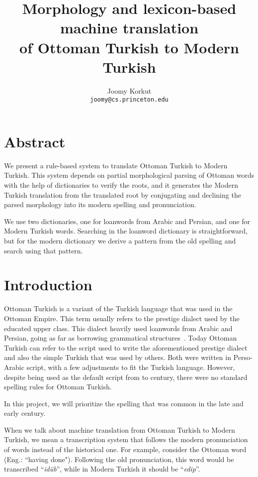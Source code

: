 \documentclass[10pt,twocolumn]{article}
\title{Morphology and lexicon-based machine translation\\of Ottoman Turkish to Modern Turkish}
\author{
  Joomy Korkut\\
  \texttt{joomy@cs.princeton.edu}
}
\date{}
\theoremstyle{nonumberplain}
\newcommand{\otto}[1]{\RLE{\ottoman{}\Large{}#1}}
\newcommand{\word}[1]{``\emph{#1}''}
\begin{document}
\setlength{\abovedisplayskip}{-17pt}
\setlength{\belowdisplayskip}{0pt}
\setlength{\abovedisplayshortskip}{0pt}
\setlength{\belowdisplayshortskip}{0pt}

\maketitle

\section*{Abstract}
We present a rule-based system to translate Ottoman Turkish to Modern Turkish.
This system depends on partial morphological parsing of Ottoman words with the help of
dictionaries to verify the roots, and it generates the Modern Turkish
translation from the translated root by conjugating and declining the parsed
morphology into its modern spelling and pronunciation.

We use two dictionaries, one for loanwords from Arabic and
Persian, and one for Modern Turkish words. Searching in the loanword dictionary
is straightforward, but for the modern dictionary we derive a pattern from the
old spelling and search using that pattern.

\section{Introduction}

Ottoman Turkish is a variant of the Turkish language that was used in the
Ottoman Empire. This term usually refers to the prestige dialect used by the
educated upper class. This dialect heavily used loanwords from Arabic and
Persian, going as far as borrowing grammatical
structures~\cite{redhouse1884simplified, hagopian1907ottoman, strauss2011linguistic}.
Today Ottoman Turkish can refer to the script used to write the
aforementioned prestige dialect and also the simple Turkish that was used by
others. Both were written in Perso-Arabic script, with a few adjustments to fit
the Turkish language.
However, despite being used as the default script from  to 
century, there were no standard spelling rules for Ottoman Turkish.

In this project, we will prioritize the spelling that was common
in the late  and early  century.

When we talk about machine translation from Ottoman Turkish to Modern Turkish,
we mean a transcription system that follows the modern pronunciation of words
instead of the historical one.
For example, consider the Ottoman word \otto{ايدوب} (Eng.: ``having done").
Following the old pronunciation, this word would be transcribed \word{idüb}, while
in Modern Turkish it should be \word{edip}.
\end{document}
